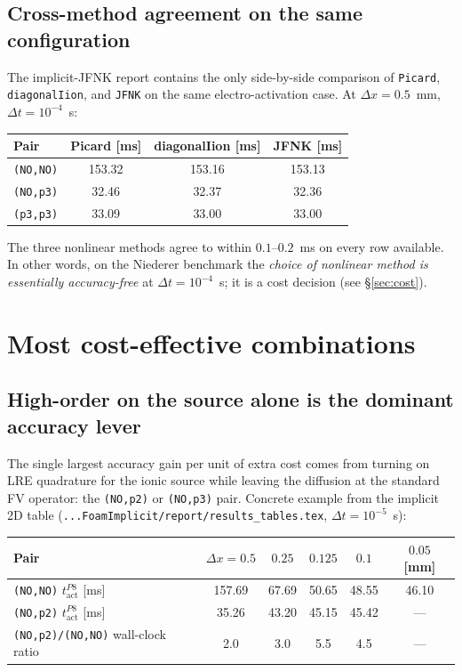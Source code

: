 \documentclass[11pt,a4paper]{article}
\newcommand{\tact}{t_{\text{act}}^{P8}}
\newcommand{\code}[1]{\texttt{\small #1}}
\begin{document}
\subsection{Cross-method agreement on the same configuration}

The implicit-JFNK report contains the only side-by-side comparison of
\code{Picard}, \code{diagonalIion}, and \code{JFNK} on the same
electro-activation case. At $\Delta x = 0.5$~mm, $\Delta t = 10^{-4}$~s:

\begin{center}\footnotesize
\begin{tabular}{lccc}
\toprule
Pair & Picard [ms] & diagonalIion [ms] & JFNK [ms] \\
\midrule
\code{(NO,NO)} & 153.32 & 153.16 & 153.13 \\
\code{(NO,p3)} &  32.46 &  32.37 &  32.36 \\
\code{(p3,p3)} &  33.09 &  33.00 &  33.00 \\
\bottomrule
\end{tabular}\end{center}

The three nonlinear methods agree to within $0.1$--$0.2$~ms on every
row available. In other words, on the Niederer benchmark the
\emph{choice of nonlinear method is essentially accuracy-free} at
$\Delta t = 10^{-4}$~s; it is a cost decision (see \S\ref{sec:cost}).

\section{Most cost-effective combinations}
\label{sec:efficient}

\subsection{High-order on the source alone is the dominant accuracy lever}

The single largest accuracy gain per unit of extra cost comes from
turning on LRE quadrature for the ionic source while leaving the
diffusion at the standard FV operator: the \code{(NO,p2)} or
\code{(NO,p3)} pair. Concrete example from the implicit 2D table
(\code{...FoamImplicit/report/results\_tables.tex}, $\Delta t = 10^{-5}$~s):

\begin{center}\footnotesize
\begin{tabular}{lccccc}
\toprule
Pair & $\Delta x = 0.5$ & $0.25$ & $0.125$ & $0.1$ & $0.05$ [mm] \\
\midrule
\code{(NO,NO)} $\tact$ [ms]              & 157.69 & 67.69 & 50.65 & 48.55 & 46.10 \\
\code{(NO,p2)} $\tact$ [ms]              &  35.26 & 43.20 & 45.15 & 45.42 & --- \\
\code{(NO,p2)/(NO,NO)} wall-clock ratio  & 2.0    & 3.0   & 5.5   & 4.5   & --- \\
\bottomrule
\end{tabular}\end{center}
\end{document}
